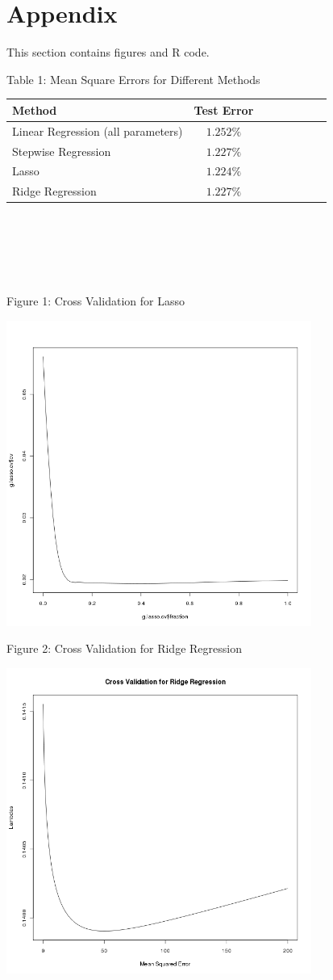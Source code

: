 \documentclass[a4paper,10pt]{article}
\begin{document}
\section{Appendix}
This section contains figures and R code.

Table 1: Mean Square Errors for Different Methods \\

\begin{tabular}{l*{6}{c}r}
 Method		& Test Error  \\
 \hline
 Linear Regression (all parameters) & $1.252\%$ \\
 Stepwise Regression & $1.227\%$ \\
 Lasso 	& $1.224\%$ \\
 Ridge Regression	& $1.227\%$ \\
\end{tabular}
\\
\\
\\
\\
\\

Figure 1: Cross Validation for Lasso

\includegraphics[width=100mm]{lasso.png}

Figure 2: Cross Validation for Ridge Regression

\includegraphics[width=100mm]{ridge.png}
\end{document}
